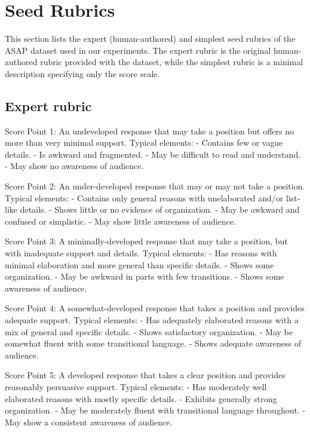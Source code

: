 \documentclass[11pt]{article}
\begin{document}
\section{Seed Rubrics}
\label{sec:appendix_rubrics}

This section lists the expert (human-authored) and simplest seed rubrics of the ASAP dataset used in our experiments. The expert rubric is the original human-authored rubric provided with the dataset, while the simplest rubric is a minimal description specifying only the score scale.

\subsection{Expert rubric}

\begin{tcolorbox}[colback=white, colframe=gray, fontupper=\small, breakable]
Score Point 1: An undeveloped response that may take a position but offers no more than very minimal support. Typical elements:
- Contains few or vague details.
- Is awkward and fragmented.
- May be difficult to read and understand.
- May show no awareness of audience.

Score Point 2: An under-developed response that may or may not take a position. Typical elements:
- Contains only general reasons with unelaborated and/or list-like details.
- Shows little or no evidence of organization.
- May be awkward and confused or simplistic.
- May show little awareness of audience.

Score Point 3: A minimally-developed response that may take a position, but with inadequate support and details. Typical elements:
- Has reasons with minimal elaboration and more general than specific details.
- Shows some organization.
- May be awkward in parts with few transitions.
- Shows some awareness of audience.

Score Point 4: A somewhat-developed response that takes a position and provides adequate support. Typical elements:
- Has adequately elaborated reasons with a mix of general and specific details.
- Shows satisfactory organization.
- May be somewhat fluent with some transitional language.
- Shows adequate awareness of audience.

Score Point 5: A developed response that takes a clear position and provides reasonably persuasive support. Typical elements:
- Has moderately well elaborated reasons with mostly specific details.
- Exhibits generally strong organization.
- May be moderately fluent with transitional language throughout.
- May show a consistent awareness of audience.


\end{tcolorbox}
\end{document}
